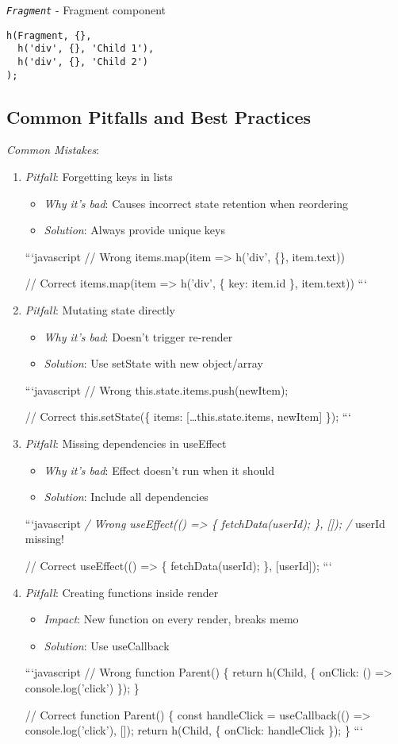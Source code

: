 \documentclass[11pt]{article}
\begin{document}
\emph{\texttt{Fragment}} - Fragment component

\begin{verbatim}
h(Fragment, {},
  h('div', {}, 'Child 1'),
  h('div', {}, 'Child 2')
);
\end{verbatim}
\subsection{Common Pitfalls and Best Practices}
\label{sec:orgf4b97ac}

\emph{Common Mistakes}:

\begin{enumerate}
\item \emph{Pitfall}: Forgetting keys in lists
\begin{itemize}
\item \emph{Why it's bad}: Causes incorrect state retention when reordering
\item \emph{Solution}: Always provide unique keys
\end{itemize}
```javascript
// Wrong
items.map(item => h('div', \{\}, item.text))

// Correct
items.map(item => h('div', \{ key: item.id \}, item.text))
```

\item \emph{Pitfall}: Mutating state directly
\begin{itemize}
\item \emph{Why it's bad}: Doesn't trigger re-render
\item \emph{Solution}: Use setState with new object/array
\end{itemize}
```javascript
// Wrong
this.state.items.push(newItem);

// Correct
this.setState(\{ items: [\ldots{}this.state.items, newItem] \});
```

\item \emph{Pitfall}: Missing dependencies in useEffect
\begin{itemize}
\item \emph{Why it's bad}: Effect doesn't run when it should
\item \emph{Solution}: Include all dependencies
\end{itemize}
```javascript
\emph{/ Wrong
useEffect(() => \{
  fetchData(userId);
\}, []); /} userId missing!

// Correct
useEffect(() => \{
  fetchData(userId);
\}, [userId]);
```

\item \emph{Pitfall}: Creating functions inside render
\begin{itemize}
\item \emph{Impact}: New function on every render, breaks memo
\item \emph{Solution}: Use useCallback
\end{itemize}
```javascript
// Wrong
function Parent() \{
  return h(Child, \{ onClick: () => console.log('click') \});
\}

// Correct
function Parent() \{
  const handleClick = useCallback(() => console.log('click'), []);
  return h(Child, \{ onClick: handleClick \});
\}
```
\end{enumerate}
\end{document}
